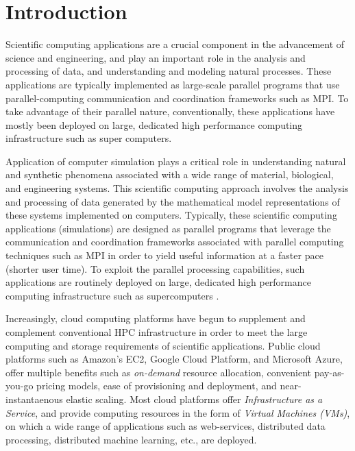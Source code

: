 \section{Introduction}


Scientific computing applications are a crucial component in the advancement of science and engineering, and play an important role in the analysis and processing of data, and understanding and modeling natural processes. 
These applications are typically implemented as large-scale parallel programs that use parallel-computing communication and coordination frameworks such as MPI.
To take advantage of their parallel nature, conventionally, these applications have mostly been deployed on large, dedicated high performance computing infrastructure such as super computers. 

\vikram
{
Application of computer simulation plays a critical role in understanding natural and synthetic phenomena associated with a wide range of material, biological, and engineering systems. This scientific computing approach involves the analysis and processing of data generated by the mathematical model representations of these systems implemented on computers. Typically, these scientific computing applications (simulations) are designed as parallel programs that leverage the communication and coordination frameworks associated with parallel computing techniques such as MPI in order to yield useful information at a faster pace (shorter user time). To exploit the parallel processing capabilities, such applications are routinely deployed on large, dedicated high performance computing infrastructure such as supercomputers \cite{bigred2,amherst,etc.}.
}


Increasingly, cloud computing platforms have begun to supplement and complement conventional HPC infrastructure in order to meet the large computing and storage requirements of scientific applications. 
Public cloud platforms such as Amazon's EC2, Google Cloud Platform, and Microsoft Azure, offer multiple benefits such as \emph{on-demand} resource allocation, convenient pay-as-you-go pricing models, ease of provisioning and deployment, and near-instantaenous elastic scaling.
Most cloud platforms offer \emph{Infrastructure as a Service}, and provide computing resources in the form of \emph{Virtual Machines (VMs)}, on which a wide range of  applications such as web-services, distributed data processing, distributed machine learning, etc., are deployed. 


